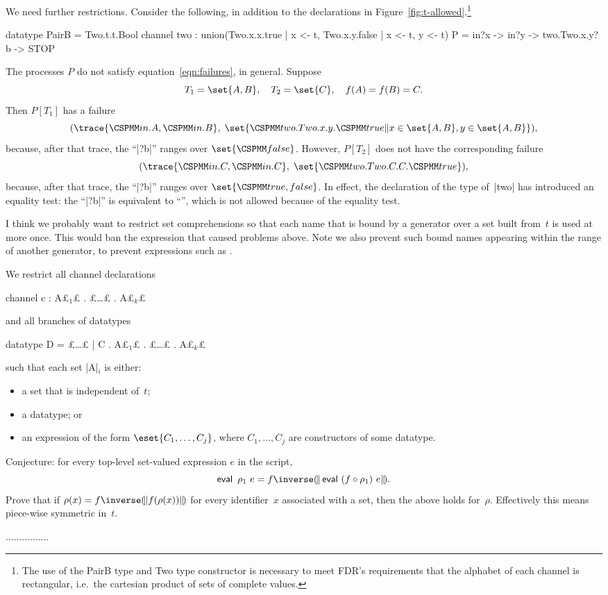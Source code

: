 We need further restrictions.  Consider the following, in addition to the
declarations in Figure~\ref{fig:t-allowed}.\footnote{The use of the
  {\cspmfont PairB} type and {\cspmfont Two} type constructor is necessary to
meet FDR's requirements that the alphabet of each channel is rectangular,
i.e.~the cartesian product of sets of complete values.}
\begin{cspm}
datatype PairB = Two.t.t.Bool
channel two : union({Two.x.x.true | x <- t}, {Two.x.y.false | x <- t, y <- t})
P = in?x -> in?y -> two.Two.x.y?b -> STOP
\end{cspm}
%
The processes $P$ do not satisfy equation~\ref{eqn:failures}, in general.
Suppose 
\[
T_1 = \set{A,B}, \quad T_2 = \set{C}, \quad f(A) = f(B) =  C.
\]
Then $P[T_1]$ has a failure
\[
(\trace{\M{in}.A, \M{in}.B},\; 
  \set{\M{two.Two}.x.y.\M{true} \| x \in \set{A,B}, y \in \set{A,B}}),
\]
because, after that trace, the ``|?b|'' ranges over $\set{\M{false}}$.  
However,  $P[T_2]$ does not have the corresponding failure
\[
(\trace{\M{in}.C, \M{in}.C},\; \set{\M{two.Two}.C.C.\M{true}}),
\]
because, after that trace, the ``|?b|'' ranges over $\set{\M{true,false}}$.
In effect, the declaration of the type of~|two| has introduced an equality
test: the ``|?b|'' is equivalent to 
``'', which is not
allowed because of the equality test. 

I think we probably want to restrict set comprehensions so that each name that
is bound by a generator over a set built from~$t$ is used at more once.  This
would ban the expression  that caused
problems above. 
%
Note we also prevent such bound names appearing within the range of another
generator, to prevent expressions such as  
.

We restrict all channel declarations
\begin{cspm}
channel c : A£$_1$£ . £\ldots£ . A£$_k$£
\end{cspm}
and all branches of datatypes
\begin{cspm}
datatype D = £\ldots£ | C . A£$_1$£ . £\ldots£ . A£$_k$£
\end{cspm}
such that each set |A|$_i$ is either:
%
\begin{itemize}
\item a set that is independent of~$t$; 

\item a datatype; or

\item an expression of the form $\eset{C_1, \ldots, C_j}$, where $C_1, \ldots,
  C_j$ are constructors of some datatype.
\end{itemize}

Conjecture: for every top-level set-valued expression $e$ in the script,
\[
\eval ~ \rho_1 ~ e = f\inverse \banana{\eval ~ (f\after\rho_1)~e}.
\]
Prove that if $\rho(x) = f\inverse \banana{f(\rho(x))}$ for every identifier~$x$
associated with a set, then the above holds for~$\rho$.  Effectively this
means piece-wise symmetric in~$t$. 

................

